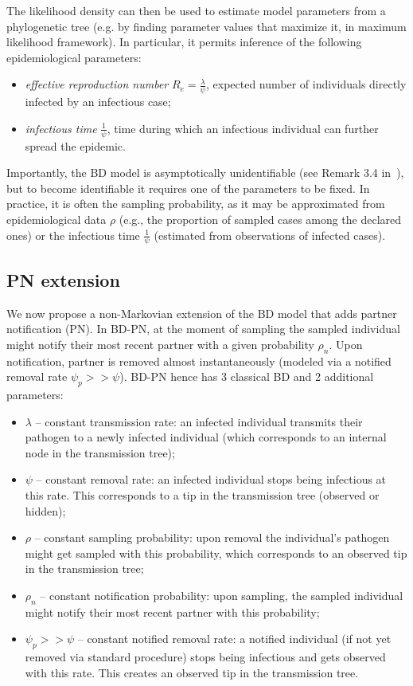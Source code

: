 \documentclass[a4paper,10pt]{article}
\begin{document}
The likelihood density can then be used to estimate model parameters from a phylogenetic tree (e.g. by finding parameter values that maximize it, in maximum likelihood framework). In particular, it permits inference of the following epidemiological parameters: 

\begin{itemize}
\item \textit{effective reproduction number} $R_e = \frac{\lambda}{\psi}$, expected number of individuals directly infected by an infectious case;
\item \textit{infectious time} $\frac{1}{\psi}$, time during which an infectious individual can further spread the epidemic.
\end{itemize} 

Importantly, the BD model is asymptotically unidentifiable (see Remark 3.4 in~\citep{Stadler2009}), but to become identifiable it requires one of the parameters to be fixed. In practice, it is often the sampling probability, as it may be approximated from epidemiological data $\rho$ (e.g., the proportion of sampled cases among the declared ones) or the infectious time $\frac{1}{\psi}$ (estimated from observations of infected cases). 


\subsection{PN extension}

We now propose a non-Markovian extension of the BD model that adds partner notification (PN).  In BD-PN, at the moment of sampling the sampled individual might notify their most recent partner with a given probability $\rho_n$. Upon notification, partner is removed almost instantaneously (modeled via a notified removal rate $\psi_p >> \psi$). BD-PN hence has 3 classical BD and 2 additional parameters:
\begin{itemize}
 \item $\lambda$ -- constant transmission rate: an infected individual transmits their pathogen to a newly infected individual (which corresponds to an internal node in the transmission tree);
 \item $\psi$ -- constant removal rate: an infected individual stops being infectious at this rate. This corresponds to a tip in the transmission tree (observed or hidden);
 \item $\rho$ -- constant sampling probability: upon removal the individual's pathogen might get sampled with this probability, which corresponds to an observed tip in the transmission tree;
 \item $\rho_n$ -- constant notification probability: upon sampling, the sampled individual might notify their most recent partner with this probability;
 \item $\psi_p >> \psi$ -- constant notified removal rate: a notified individual (if not yet removed via standard procedure) stops being infectious and gets observed with this rate. This creates an observed tip in the transmission tree.
\end{itemize}
\end{document}

